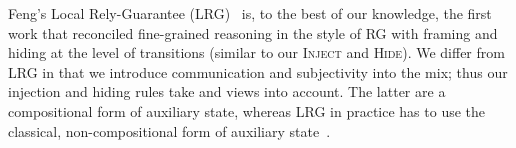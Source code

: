 Feng's Local Rely-Guarantee (LRG)~\cite{Feng:POPL09} is, to the best
of our knowledge, the first work that reconciled fine-grained
reasoning in the style of RG with framing and hiding at the level of
transitions (similar to our \textsc{Inject} and \textsc{Hide}). We
differ from LRG in that we introduce communication and subjectivity
into the mix; thus our injection and hiding rules take \self and
\other views into account. The latter are a compositional form of
auxiliary state, whereas LRG in practice has to use the classical,
non-compositional form of auxiliary
state~\cite{Owicki-Gries:CACM76,LeyWild-Nanevski:POPL13}.
%
